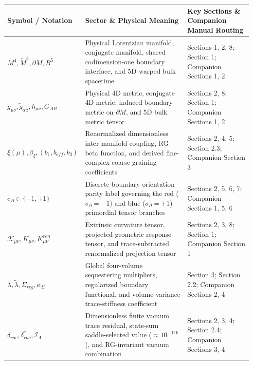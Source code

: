 \documentclass[aps,prd,onecolumn,superscriptaddress,nofootinbib,longbibliography,10pt]{revtex4-2}
\begin{document}
  
\begin{center}
\begin{tabular}{|lll|}
\hline

      Symbol / Notation & Sector \& Physical Meaning & Key Sections \& Companion Manual Routing
       \\ \hline

    
    
      \(M^4, \tilde{M}^4, \partial M, B^5\) & Physical Lorentzian manifold, conjugate manifold, shared codimension-one boundary interface, and 5D warped bulk spacetime & Sections 1, 2, 8; Section 1; Companion Sections 1, 2 \\ \hline

      \(g_{\mu\nu}, \tilde{g}_{\alpha\beta}, h_{\mu\nu}, G_{AB}\) & Physical 4D metric, conjugate 4D metric, induced boundary metric on \(\partial M\), and 5D bulk metric tensor & Sections 2, 8; Section 1; Companion Sections 1, 2 \\ \hline

      \(\xi(\mu), \beta_\xi, (b_1, b_{eff}, b_3)\) & Renormalized dimensionless inter-manifold coupling, RG beta function, and derived fine-complex coarse-graining coefficients & Sections 2, 4, 5; Section 2.3; Companion Section 3 \\ \hline

      \(\sigma_\partial \in \{-1, +1\}\) & Discrete boundary orientation parity label governing the red (\(\sigma_\partial = -1\)) and blue (\(\sigma_\partial = +1\)) primordial tensor branches & Sections 2, 5, 6, 7; Companion Sections 1, 5, 6 \\ \hline

      \(\mathcal{K}_{\mu\nu}, K_{\mu\nu}, K_{\mu\nu}^{ren}\) & Extrinsic curvature tensor, projected geometric response tensor, and trace-subtracted renormalized projection tensor & Sections 2, 3, 8; Section 1; Companion Section 1 \\ \hline

      \(\lambda, \tilde{\lambda}, \Sigma_{reg}, \kappa_\Sigma\) & Global four-volume sequestering multipliers, regularized boundary functional, and volume-variance trace-stiffness coefficient & Section 3; Section 2.2; Companion Sections 2, 4 \\ \hline

      \(\delta_{vac}, \delta_{vac}^*, \mathcal{I}_\Lambda\) & Dimensionless finite vacuum trace residual, state-sum saddle-selected value (\(\approx 10^{-110}\)), and RG-invariant vacuum combination & Sections 2, 3, 4; Section 2.4; Companion Sections 3, 4 \\ \hline


\end{tabular}
\end{center}
\end{document}
